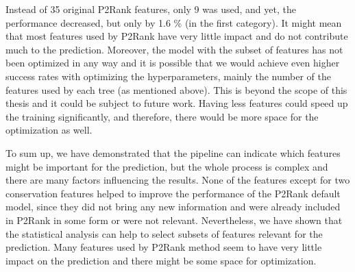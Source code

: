 \begin{table}[] \centering
{}
\caption[Comparison of the models with all P2Rank features and a subset of P2Rank features]{Comparison of the models with all P2Rank features and a subset of P2Rank features, plus \texttt{pdbekb\_conservation} csv feature. The model highlighted in gray was mentioned before and is stated here again for comparison.\newline
The subset of P2Rank features is following: 
\texttt{protrusion, bfactor, hydrophatyIndex, aromatic, hBondDonor, hBondAcceptor, hBondDonorAcceptor, hydrophobic, hydrophilic}.
}
\label{tab:subset}
\end{table}

Instead of 35 original P2Rank features, only 9 was used, and yet, the performance decreased, but only by 1.6 \% (in the first category). It might mean that most features used by P2Rank have very little impact and do not contribute much to the prediction. Moreover, the model with the subset of features has not been optimized in any way and it is possible that we would achieve even higher success rates with optimizing the hyperparameters, mainly the number of the features used by each tree (as mentioned above). This is beyond the scope of this thesis and it could be subject to future work. Having less features could speed up the training significantly, and therefore, there would be more space for the optimization as well.

To sum up, we have demonstrated that the pipeline can indicate which features might be important for the prediction, but the whole process is complex and there are many factors influencing the results. None of the features except for two conservation features helped to improve the performance of the P2Rank default model, since they did not bring any new information and were already included in P2Rank in some form or were not relevant. Nevertheless, we have shown that the statistical analysis can help to select subsets of features relevant for the prediction. Many features used by P2Rank method seem to have very little impact on the prediction and there might be some space for optimization.


